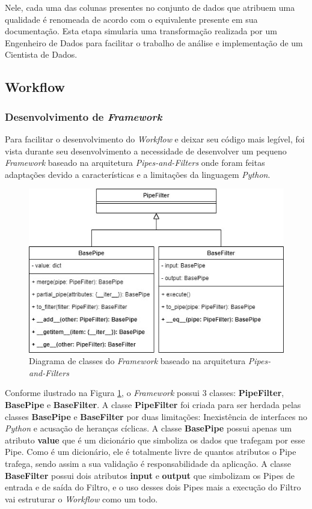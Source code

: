 \documentclass[portugues]{ic-tese}
\begin{document}
Nele, cada uma das colunas presentes no conjunto de dados que atribuem uma qualidade é renomeada de acordo com o equivalente presente em sua documentação. Esta etapa simularia uma transformação realizada por um Engenheiro de Dados para facilitar o trabalho de análise e implementação de um Cientista de Dados.

\subsection{Workflow}

\subsubsection{Desenvolvimento de \textit{Framework}}

Para facilitar o desenvolvimento do \textit{Workflow} e deixar seu código mais legível, foi vista durante seu desenvolvimento a necessidade de desenvolver um pequeno \textit{Framework} baseado na arquitetura \textit{Pipes-and-Filters} onde foram feitas adaptações devido a características e a limitações da linguagem \textit{Python}.

\begin{figure}[H]
\centering
\includegraphics[scale=0.8]{images/classdiagram_Pipe-and-Filter_framework.jpg}
\caption {Diagrama de classes do \textit{Framework} baseado na arquitetura \textit{Pipes-and-Filters}}
\label{fig:PipeAndFilterFramework}
\end{figure}

Conforme ilustrado na Figura \ref{fig:PipeAndFilterFramework}, o \textit{Framework} possui 3 classes: \textbf{PipeFilter}, \textbf{BasePipe} e \textbf{BaseFilter}. A classe \textbf{PipeFilter} foi criada para ser herdada pelas classes \textbf{BasePipe} e \textbf{BaseFilter} por duas limitações: Inexistência de interfaces no \textit{Python} e acusação de heranças cíclicas. A classe \textbf{BasePipe} possui apenas um atributo \textbf{value} que é um dicionário que simboliza os dados que trafegam por esse Pipe. Como é um dicionário, ele é totalmente livre de quantos atributos o Pipe trafega, sendo assim a sua validação é responsabilidade da aplicação. A classe \textbf{BaseFilter} possui dois atributos \textbf{input} e \textbf{output} que simbolizam os Pipes de entrada e de saída do Filtro, e o uso desses dois Pipes mais a execução do Filtro vai estruturar o \textit{Workflow} como um todo.
\end{document}
